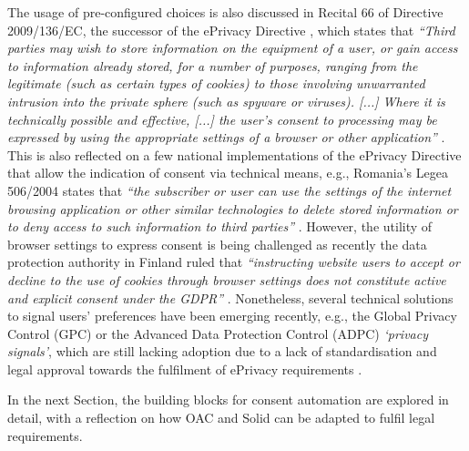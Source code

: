 The usage of pre-configured choices is also discussed in Recital 66 of Directive 2009/136/EC, the successor of the ePrivacy Directive \citeyearpar{noauthor_directive_2002}, which states that \textit{``Third parties may wish to store information on the equipment of a user, or gain access to information already stored, for a number of purposes, ranging from the legitimate (such as certain types of cookies) to those involving unwarranted intrusion into the private sphere (such as spyware or viruses). [...] Where it is technically possible and effective, [...] the user’s consent to processing may be expressed by using the appropriate settings of a browser or other application''} \citeyearpar{noauthor_directive_2009}.
This is also reflected on a few national implementations of the ePrivacy Directive that allow the indication of consent via technical means, e.g., Romania's Legea 506/2004 states that \textit{``the subscriber or user can use the settings of the internet browsing application or other similar technologies to delete stored information or to deny access to such information to third parties''} \citeyearpar{noauthor_legea_2004}.
However, the utility of browser settings to express consent is being challenged as recently the data protection authority in Finland ruled that \textit{``instructing website users to accept or decline to the use of cookies through browser settings does not constitute active and explicit consent under the GDPR''} \citep{fich_finland_2021}.
Nonetheless, several technical solutions to signal users' preferences have been emerging recently, e.g., the Global Privacy Control (GPC) \citep{global_privacy_control_gpc_2021} or the Advanced Data Protection Control (ADPC) \citep{human_advanced_2021} \textit{`privacy signals'}, which are still lacking adoption due to a lack of standardisation and legal approval towards the fulfilment of ePrivacy requirements \citep{santos_how_2023}.

In the next Section, the building blocks for consent automation are explored in detail, with a reflection on how OAC and Solid can be adapted to fulfil legal requirements. 